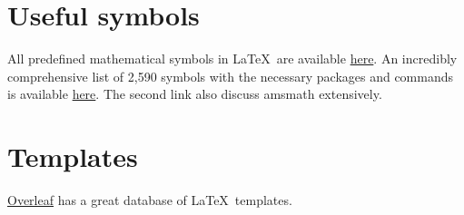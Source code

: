 \documentclass{article}
\begin{document}
\section{Useful symbols}

All predefined mathematical symbols in \LaTeX\ are available \href{https://oeis.org/wiki/List_of_LaTeX_mathematical_symbols}{here}. An incredibly comprehensive list of 2,590 symbols with the necessary packages and commands is available \href{https://math.uoregon.edu/wp-content/uploads/2014/12/compsymb-1qyb3zd.pdf}{here}. The second link also discuss amsmath extensively.

\section{Templates}

\href{https://www.overleaf.com/latex/templates/}{Overleaf} has a great database of \LaTeX\ templates.
\end{document}
